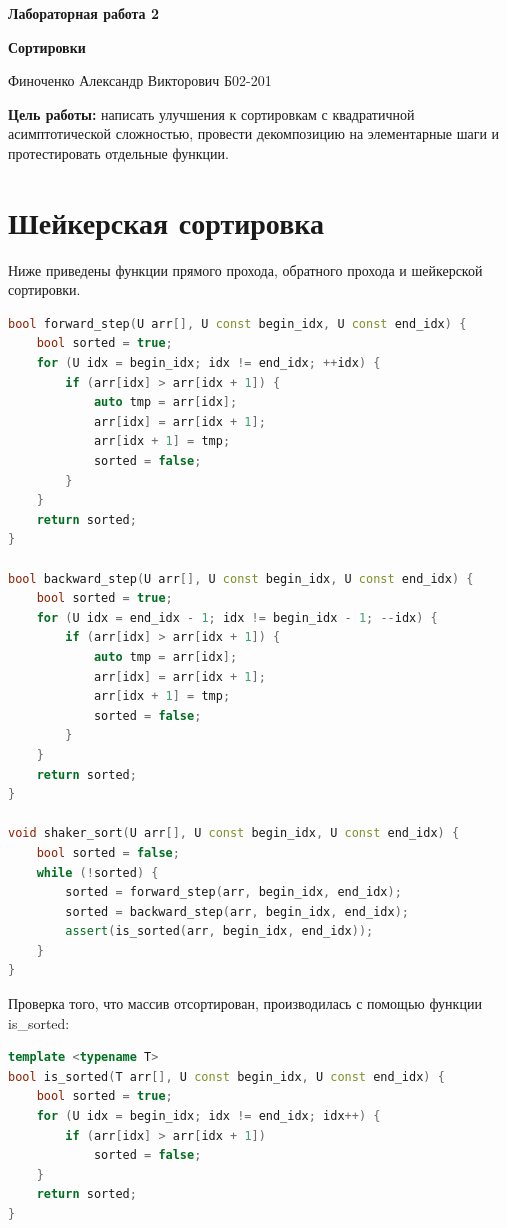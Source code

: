 \documentclass[a4paper,12pt]{article}
\author{Финоченко Александр}
\title{}
\date{\today}
\begin{document}
\begin{center}
\Large{
\textbf{Лабораторная работа 2}

\textbf{Сортировки}

Финоченко Александр Викторович Б02-201
}

\end{center}
\large

\textbf{Цель работы:} написать улучшения к сортировкам с квадратичной асимптотической сложностью, провести декомпозицию на элементарные шаги и
протестировать отдельные функции.

\section*{Шейкерская сортировка}
Ниже приведены функции прямого прохода, обратного прохода и шейкерской сортировки.

\begin{lstlisting}[language=C++]
bool forward_step(U arr[], U const begin_idx, U const end_idx) {
    bool sorted = true;
    for (U idx = begin_idx; idx != end_idx; ++idx) {
        if (arr[idx] > arr[idx + 1]) {
            auto tmp = arr[idx];
            arr[idx] = arr[idx + 1];
            arr[idx + 1] = tmp;
            sorted = false;
        }
    }
    return sorted;
}

bool backward_step(U arr[], U const begin_idx, U const end_idx) {
    bool sorted = true;
    for (U idx = end_idx - 1; idx != begin_idx - 1; --idx) {
        if (arr[idx] > arr[idx + 1]) {
            auto tmp = arr[idx];
            arr[idx] = arr[idx + 1];
            arr[idx + 1] = tmp;
            sorted = false;
        }
    }
    return sorted;
}

void shaker_sort(U arr[], U const begin_idx, U const end_idx) {
    bool sorted = false;
    while (!sorted) {
        sorted = forward_step(arr, begin_idx, end_idx);
        sorted = backward_step(arr, begin_idx, end_idx);
        assert(is_sorted(arr, begin_idx, end_idx));
    }
}
\end{lstlisting}

Проверка того, что массив отсортирован, производилась с помощью функции is\_sorted:

\begin{lstlisting}[language=C++]
template <typename T>
bool is_sorted(T arr[], U const begin_idx, U const end_idx) {
    bool sorted = true;
    for (U idx = begin_idx; idx != end_idx; idx++) {
        if (arr[idx] > arr[idx + 1])
            sorted = false;
    }
    return sorted;
}
\end{lstlisting}
\end{document}
